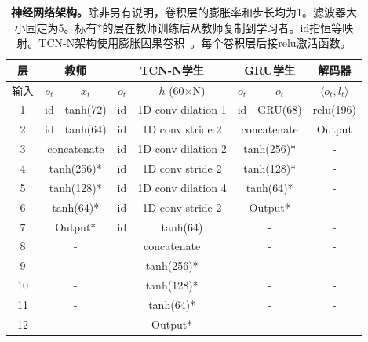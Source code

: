 \documentclass[9pt,twocolumn,twoside]{osajnl}
\begin{document}
\begin{table}
\centering
 \begin{tabular}{|c|c|c|c|c|c|c|c|}
\hline
层 & \multicolumn{2}{|c|}{教师} &  \multicolumn{2}{|c|}{TCN-N学生} & \multicolumn{2}{|c|}{GRU学生}  & {解码器} \\ \hline
输入 & $o_t$ & $x_t$ & $o_t$ & $h$ (60$\times$N) & $o_t$ & $o_t$ & {$\langle o_t, l_t \rangle$} \\ \hline
1 & id & tanh(72) & id & 1D conv dilation 1 & id & GRU(68)  & {relu(196)} \\ \hline
2 & id & tanh(64) & id & 1D conv stride 2 & \multicolumn{2}{|c|}{concatenate} & {Output} \\ \hline
3 & \multicolumn{2}{|c|}{concatenate }& id & 1D conv dilation 2 &  \multicolumn{2}{|c|}{tanh(256)*}  & {-} \\ \hline
4 &  \multicolumn{2}{|c|}{tanh(256)*}  &  id &  1D conv stride 2 &  \multicolumn{2}{|c|}{tanh(128)*} & {-}\\ \hline
5 & \multicolumn{2}{|c|}{tanh(128)*} & id &  1D conv dilation 4  &\multicolumn{2}{|c|}{tanh(64)*} & {-}\\ \hline
6 & \multicolumn{2}{|c|}{tanh(64)*} & id &  1D conv stride 2 & \multicolumn{2}{|c|}{Output*} & {-} \\ \hline
7 &  \multicolumn{2}{|c|}{Output*} & id & tanh(64) & \multicolumn{2}{|c|}{-} & {-} \\ \hline
8 &  \multicolumn{2}{|c|}{-} & \multicolumn{2}{|c|}{concatenate} & \multicolumn{2}{|c|}{-} & {-} \\ \hline
9 &  \multicolumn{2}{|c|}{-} & \multicolumn{2}{|c|}{tanh(256)*} & \multicolumn{2}{|c|}{-} & {-} \\ \hline
10 &  \multicolumn{2}{|c|}{-} & \multicolumn{2}{|c|}{tanh(128)*} & \multicolumn{2}{|c|}{-} & {-} \\ \hline
11 &  \multicolumn{2}{|c|}{-} & \multicolumn{2}{|c|}{tanh(64)*} & \multicolumn{2}{|c|}{-} & {-} \\ \hline
12 &  \multicolumn{2}{|c|}{-} & \multicolumn{2}{|c|}{Output*} & \multicolumn{2}{|c|}{-} & {-} \\ \hline
 \end{tabular}
 \caption{\textbf{神经网络架构。}除非另有说明，卷积层的膨胀率和步长均为1。滤波器大小固定为5。标有$*$的层在教师训练后从教师复制到学习者。id指恒等映射。TCN-N架构使用膨胀因果卷积~\cite{bai2018empirical}。每个卷积层后接relu激活函数。}  \label{tab:netarchitectures}
\end{table}
\end{document}
